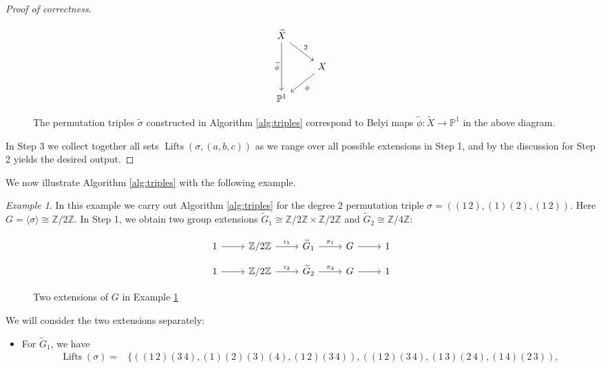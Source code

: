 \documentclass{dcthesis}
\newcommand{\PP}{\mathbb P}
\newcommand{\ZZ}{\mathbb Z}
\newcommand{\wt}[1]{\widetilde{#1}}
\DeclareMathOperator{\Lifts}{Lifts}
\theoremstyle{definition}
\theoremstyle{remark}
\newtheorem{example}[prop]{Example}
\numberwithin{equation}{section}
\numberwithin{figure}{section}
\begin{document}
{{\begin{proof}[Proof of correctness]
\begin{figure}[ht]
\[\begin{tikzcd}[ampersand replacement=\&]
            \widetilde{X}\arrow{dd}[swap]{\widetilde{\phi}}\arrow{dr}{2}\\
            \&X\arrow{dl}{\phi}\\
            \PP^1
          \end{tikzcd}
        \]
        \caption{
          The permutation triples $\wt{\sigma}$ constructed in
          Algorithm \ref{alg:triples}
          correspond to Belyi maps $\wt{\phi}:\wt{X}\to\PP^1$
          in the above diagram.
        }
        \label{fig:liftbelyimap}
      \end{figure}
      In Step 3 we collect together all sets $\Lifts(\sigma, (a,b,c))$
      as we range over all possible extensions in Step 1,
      and by the discussion for Step 2 yields the desired output.
    \end{proof}
    We now illustrate Algorithm \ref{alg:triples}
    with the following example.
    \begin{example}\label{exm:lift}
      In this example we carry out Algorithm \ref{alg:triples} for
      the degree $2$ permutation triple
      $\sigma = ((1\,2),(1)(2),(1\,2))$.
      Here $G = \langle\sigma\rangle\cong\ZZ/2\ZZ$.
      In Step 1,
      we obtain two group extensions
      $\wt{G}_1\cong\ZZ/2\ZZ\times\ZZ/2\ZZ$
      and
      $\wt{G}_2\cong\ZZ/4\ZZ$:
      \begin{figure}[ht]
        \[
          \begin{tikzcd}[ampersand replacement=\&, row sep = small]
            1\arrow{r}\&\ZZ/2\ZZ\arrow{r}{\iota_1}\&\wt{G}_1\arrow{r}{\pi_1}\&G\arrow{r}\&1
          \end{tikzcd}
        \]
        \[
          \begin{tikzcd}[ampersand replacement=\&, row sep = small]
            1\arrow{r}\&\ZZ/2\ZZ\arrow{r}{\iota_2}\&\wt{G}_2\arrow{r}{\pi_2}\&G\arrow{r}\&1
          \end{tikzcd}
        \]
        \caption{Two extensions of $G$ in Example \ref{exm:lift}}
        \label{fig:liftexampleextensions}
      \end{figure}
      We will consider the two extensions separately:
      \begin{itemize}
        \item
          For $\wt{G}_1$, we have
          \begin{align*}
            \Lifts(\sigma) =
            &\Big\{
              ((1\,2)(3\,4), (1)(2)(3)(4), (1\,2)(3\,4)),
              ((1\,2)(3\,4), (1\,3)(2\,4), (1\,4)(2\,3)),\\

\end{align*}
\end{itemize}
\end{example}}}
\end{document}
